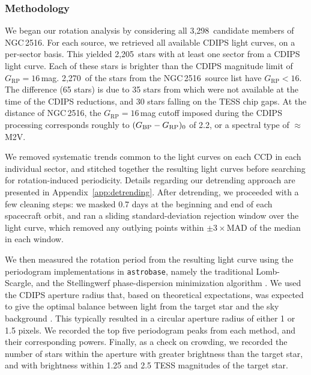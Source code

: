 \documentclass[12pt,twocolumn,tighten]{aastex63}
\newcommand{\cn}{NGC\,2516} %
\newcommand{\nkinematic}{3{,}298} %
\newcommand{\ncdips}{2{,}205}
\newcommand{\nkinematicrpltsixteen}{2{,}270}
\newcommand{\bpmrpo}{(G_{\rm BP}-G_{\rm RP})_0}
\begin{document}
\subsubsection{Methodology}
\label{subsubsec:cluster}


We began our rotation analysis by considering all \nkinematic\
candidate members of \cn.  For each source, we retrieved all available
CDIPS light curves, on a per-sector basis.  This yielded \ncdips\
stars with at least one sector from a CDIPS light curve.  Each of
these stars is brighter than the CDIPS magnitude limit of
$G_\mathrm{RP}=16$\,mag.  \nkinematicrpltsixteen\ of the stars from the \cn\
source list have $G_\mathrm{RP}<16$.  The difference (65 stars) is due to 35 stars
from \citet{meingast_2021} which were not available at the time of the
CDIPS reductions, and 30 stars falling on the TESS chip gaps.  At the
distance of \cn, the $G_\mathrm{RP}=16$\,mag cutoff imposed during the CDIPS
processing corresponds roughly to $\bpmrpo$ of 2.2, or a spectral type
of $\approx$M2V.

We removed systematic trends common to the light curves on each
CCD in each individual sector, and stitched together the resulting
light curves before searching for rotation-induced periodicity.
Details regarding our detrending approach are presented in
Appendix~\ref{app:detrending}.  After detrending, we proceeded with a
few cleaning steps: we masked 0.7 days at the beginning and end of
each spacecraft orbit, and ran a sliding standard-deviation rejection
window over the light curve, which removed any outlying points within
$\pm3\times$MAD of the median in each window.

We then measured the rotation period from the resulting light curve
using the periodogram implementations in \texttt{astrobase}, namely
the traditional Lomb-Scargle, and the Stellingwerf phase-dispersion
minimization algorithm
\citep{lomb_1976,stellingwerf_period_1978,scargle_studies_1982,stellingwerf_period_2011,bhatti_astrobase_2018}.
We used the CDIPS aperture radius that, based on theoretical
expectations, was expected to give the optimal balance between light
from the target star and the sky background \citep{Sullivan_2015}.  This
typically resulted in a circular aperture radius of either 1 or 1.5 pixels.
We recorded the top five periodogram peaks from each method, and their
corresponding powers.  Finally, as a check on crowding, we recorded
the number of stars within the aperture with greater
brightness than the target star, and with brightness within 1.25 and
2.5 TESS magnitudes of the target star.
\end{document}
